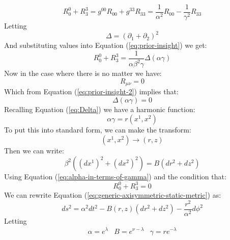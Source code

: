 \documentclass{article}
\begin{document}
\begin{equation}
R^{0}_{0}+R^{3}_{3}=g^{00}R_{00}+g^{33}R_{33}=\frac{1}{\alpha^{2}}R_{00}-\frac{1}{\gamma^{2}}R_{33}\label{eq:prior-insight}
\end{equation}
Letting
\begin{equation}
\Delta=\left(\partial_{1}+\partial_{2}\right)^{2}\label{eq:Delta}
\end{equation}
And substituting values into Equation (\ref{eq:prior-insight}) we get:
\begin{equation}
R^{0}_{0}+R^{3}_{3}=\frac{1}{\alpha\beta^{2}\gamma}\Delta\left(\alpha\gamma\right)\label{eq:prior-insight-2}
\end{equation}
Now in the case where there is no matter we have:
\begin{equation}
R_{\mu\nu}=0\label{eq:vacuum-solutions}
\end{equation}
Which from Equation (\ref{eq:prior-insight-2}) implies that:
\begin{equation}
\Delta\left(\alpha\gamma\right)=0
\end{equation}
Recalling Equation (\ref{eq:Delta}) we have a harmonic function:
\begin{equation}
\alpha\gamma=r\left(x^{1},x^{2}\right)\label{eq:alpha-in-terms-of-gamma}
\end{equation}
To put this into standard form, we can make the transform:
\begin{equation}
\left(x^{1},x^{2}\right)\rightarrow\left(r,z\right)
\end{equation}
Then we can write:
\begin{equation}
\beta^{2}\left(\left(dx^{1}\right)^{2}+\left(dx^{2}\right)^{2}\right)=B\left(dr^{2}+dz^{2}\right)
\end{equation} 
Using Equation (\ref{eq:alpha-in-terms-of-gamma}) and the condition that:
\begin{equation}
R^{0}_{0}+R^{3}_{3}=0
\end{equation}
We can rewrite Equation (\ref{eq:generic-axisymmetric-static-metric}) as:
\begin{equation}
ds^{2}=\alpha^{2}dt^{2}-B\left(r,z\right)\left(dr^{2}+dz^{2}\right)-\frac{r^{2}}{\alpha^{2}}d\phi^{2}
\end{equation}
Letting
\begin{equation}
\begin{array}{ccc}
\alpha=e^{\lambda} & B=e^{\nu-\lambda} & \gamma=re^{-\lambda}
\end{array}\label{eq:weyl-sustitutions}
\end{equation}
\end{document}
